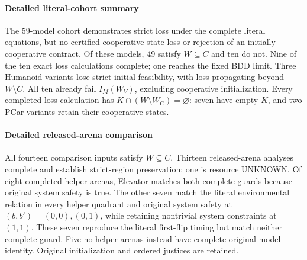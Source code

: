 \paragraph{Detailed literal-cohort summary}
The 59-model cohort demonstrates strict loss under the complete literal equations, but no certified cooperative-state loss or rejection of an initially cooperative contract. Of these models, 49 satisfy $W\subseteq C$ and ten do not. Nine of the ten exact loss calculations complete; one reaches the fixed BDD limit. Three Humanoid variants lose strict initial feasibility, with loss propagating beyond $W\setminus C$. All ten already fail $I_M(W_V)$, excluding cooperative initialization. Every completed loss calculation has $K\cap(W\setminus W_C)=\varnothing$: seven have empty $K$, and two PCar variants retain their cooperative states.

\paragraph{Detailed released-arena comparison}
All fourteen comparison inputs satisfy $W\subseteq C$. Thirteen released-arena analyses complete and establish strict-region preservation; one is resource UNKNOWN. Of eight completed helper arenas, Elevator matches both complete guards because original system safety is true. The other seven match the literal environmental relation in every helper quadrant and original system safety at $(b,b')=(0,0),(0,1)$, while retaining nontrivial system constraints at $(1,1)$. These seven reproduce the literal first-flip timing but match neither complete guard.
Five no-helper arenas instead have complete original-model identity. Original initialization and ordered justices are retained.
